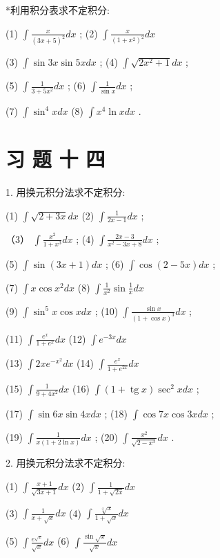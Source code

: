 \documentclass[10pt]{article}
\begin{document}
*利用积分表求不定积分:

(1) \(\int \frac{x}{{\left( 3x + 5\right) }^{2}}{dx}\) ; (2) \(\int \frac{x}{{\left( 1 + {x}^{2}\right) }^{2}}{dx}\)

(3) \(\int \sin {3x}\sin {5xdx}\) ; (4) \(\int \sqrt{2{x}^{2} + 1}{dx}\) ;

(5) \(\int \frac{1}{3 + 5{x}^{2}}{dx}\) ; (6) \(\int \frac{1}{\sin x}{dx}\) ;

(7) \(\int {\sin }^{4}{xdx}\) (8) \(\int {x}^{4}\ln {xdx}\) .

\section*{习 题 十 四}

1. 用换元积分法求不定积分:

(1) \(\int \sqrt{2 + {3x}}{dx}\) (2) \(\int \frac{1}{{2x} - 1}{dx}\) ;

（3） \(\int \frac{{x}^{2}}{1 + {x}^{3}}{dx}\) ; (4) \(\int \frac{{2x} - 3}{{x}^{2} - {3x} + 8}{dx}\) ;

(5) \(\int \sin \left( {{3x} + 1}\right) {dx}\) ; (6) \(\int \cos \left( {2 - {5x}}\right) {dx}\) ;

(7) \(\int x\cos {x}^{2}{dx}\) (8) \(\int \frac{1}{{x}^{2}}\sin \frac{1}{x}{dx}\)

(9) \(\int {\sin }^{5}x\cos {xdx}\) ; (10) \(\int \frac{\sin x}{{\left( 1 + \cos x\right) }^{3}}{dx}\) ;

(11) \(\int \frac{{e}^{x}}{1 + {e}^{x}}{dx}\) (12) \(\int {e}^{-{3x}}{dx}\)

(13) \(\int {2x}{e}^{-{x}^{2}}{dx}\) (14) \(\int \frac{{e}^{x}}{1 + {e}^{2x}}{dx}\)

(15) \(\int \frac{1}{9 + 4{x}^{2}}{dx}\) (16) \(\int \left( {1 + \operatorname{tg}x}\right) {\sec }^{2}{xdx}\) ;

(17) \(\int \sin {6x}\sin {4xdx}\) ; (18) \(\int \cos {7x}\cos {3xdx}\) ;

(19) \(\int \frac{1}{x\left( {1 + 2\ln x}\right) }{dx}\) ; (20) \(\int \frac{{x}^{2}}{\sqrt{2 - {x}^{3}}}{dx}\) .

2. 用换元积分法求不定积分:

(1) \(\int \frac{x + 1}{\sqrt{{3x} + 1}}{dx}\) (2) \(\int \frac{1}{1 + \sqrt{2x}}{dx}\)

(3) \(\int \frac{1}{x + \sqrt{x}}{dx}\) (4) \(\int \frac{\sqrt[4]{x}}{1 + \sqrt{x}}{dx}\)

(5) \(\int \frac{{e}^{\sqrt{x}}}{\sqrt{x}}{dx}\) (6) \(\int \frac{\sin \sqrt{x}}{\sqrt{x}}{dx}\)
\end{document}
